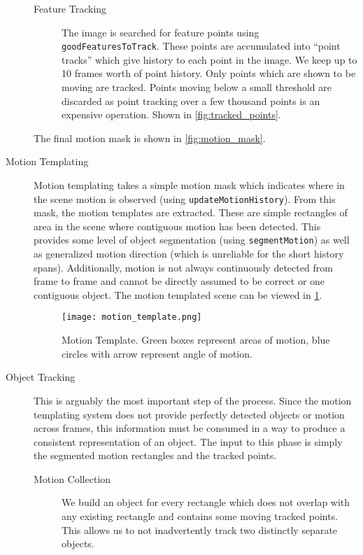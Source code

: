 \documentclass[11pt]{article}
\begin{document}
\begin{description}
\begin{description}
\item[Feature Tracking]

The image is searched for feature points using \texttt{goodFeaturesToTrack}. These points are accumulated into ``point tracks'' which give history to each point in the image. We keep up to 10 frames worth of point history. Only points which are shown to be moving are tracked. Points moving below a small threshold are discarded as point tracking over a few thousand points is an expensive operation. Shown in \cref{fig:tracked_points}.
\end{description}

The final motion mask is shown in \cref{fig:motion_mask}.

\item[Motion Templating]

Motion templating takes a simple motion mask which indicates where in the scene motion is observed (using \texttt{updateMotionHistory}). From this mask, the motion templates are extracted. These are simple rectangles of area in the scene where contiguous motion has been detected. This provides some level of object segmentation (using \texttt{segmentMotion}) as well as generalized motion direction (which is unreliable for the short history spans). Additionally, motion is not always continuously detected from frame to frame and cannot be directly assumed to be correct or one contiguous object. The motion templated scene can be viewed in \cref{fig:motion_template}.

\begin{figure}[h]
\centering
\captionsetup{width=0.8\textwidth}
\texttt{[image: motion\_template.png]}
\caption{Motion Template. Green boxes represent areas of motion, blue circles with arrow represent angle of motion.}
\label{fig:motion_template}
\end{figure}

\item[Object Tracking]

This is arguably the most important step of the process. Since the motion templating system does not provide perfectly detected objects or motion across frames, this information must be consumed in a way to produce a consistent representation of an object. The input to this phase is simply the segmented motion rectangles and the tracked points.

\begin{description}
\item[Motion Collection]
We build an object for every rectangle which does not overlap with any existing rectangle and contains some moving tracked points. This allows us to not inadvertently track two distinctly separate objects.


\end{description}
\end{description}
\end{document}
